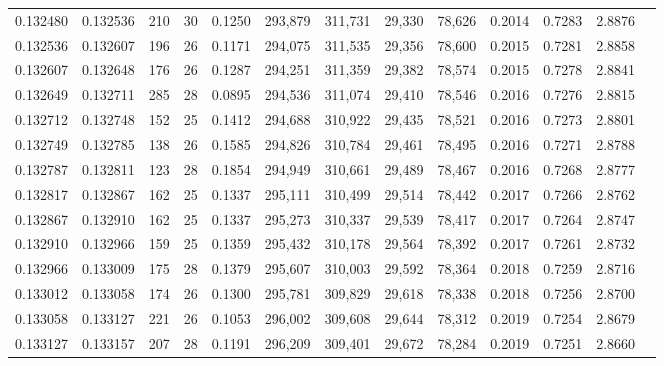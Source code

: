 \begin{tabular}{rrrrrrrrrrrrr}
0.132480 & 0.132536 & 210 &  30 &                                     0.1250 & 293,879 & 311,731 &  29,330 &  78,626 & 0.2014 & 0.7283 & 2.8876 \\
0.132536 & 0.132607 & 196 &  26 &                                     0.1171 & 294,075 & 311,535 &  29,356 &  78,600 & 0.2015 & 0.7281 & 2.8858 \\
0.132607 & 0.132648 & 176 &  26 &                                     0.1287 & 294,251 & 311,359 &  29,382 &  78,574 & 0.2015 & 0.7278 & 2.8841 \\
0.132649 & 0.132711 & 285 &  28 &                                     0.0895 & 294,536 & 311,074 &  29,410 &  78,546 & 0.2016 & 0.7276 & 2.8815 \\
0.132712 & 0.132748 & 152 &  25 &                                     0.1412 & 294,688 & 310,922 &  29,435 &  78,521 & 0.2016 & 0.7273 & 2.8801 \\
0.132749 & 0.132785 & 138 &  26 &                                     0.1585 & 294,826 & 310,784 &  29,461 &  78,495 & 0.2016 & 0.7271 & 2.8788 \\
0.132787 & 0.132811 & 123 &  28 &                                     0.1854 & 294,949 & 310,661 &  29,489 &  78,467 & 0.2016 & 0.7268 & 2.8777 \\
0.132817 & 0.132867 & 162 &  25 &                                     0.1337 & 295,111 & 310,499 &  29,514 &  78,442 & 0.2017 & 0.7266 & 2.8762 \\
0.132867 & 0.132910 & 162 &  25 &                                     0.1337 & 295,273 & 310,337 &  29,539 &  78,417 & 0.2017 & 0.7264 & 2.8747 \\
0.132910 & 0.132966 & 159 &  25 &                                     0.1359 & 295,432 & 310,178 &  29,564 &  78,392 & 0.2017 & 0.7261 & 2.8732 \\
0.132966 & 0.133009 & 175 &  28 &                                     0.1379 & 295,607 & 310,003 &  29,592 &  78,364 & 0.2018 & 0.7259 & 2.8716 \\
0.133012 & 0.133058 & 174 &  26 &                                     0.1300 & 295,781 & 309,829 &  29,618 &  78,338 & 0.2018 & 0.7256 & 2.8700 \\
0.133058 & 0.133127 & 221 &  26 &                                     0.1053 & 296,002 & 309,608 &  29,644 &  78,312 & 0.2019 & 0.7254 & 2.8679 \\
0.133127 & 0.133157 & 207 &  28 &                                     0.1191 & 296,209 & 309,401 &  29,672 &  78,284 & 0.2019 & 0.7251 & 2.8660 \\

\end{tabular}
